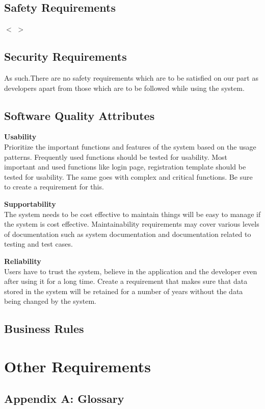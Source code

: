 \documentclass{scrreprt}
\begin{document}
\section{Safety Requirements}
$<$   $>$

\section{Security Requirements}
As such.There are no safety requirements which are to be satisfied on our part as developers apart from those which are to be followed while using the system.


\section{Software Quality Attributes}

\item \textbf{Usability}  \\
Prioritize the important functions and features of the system based on the usage patterns. Frequently used functions should be tested for usability. Most important and used functions like login page, registration template should be tested for usability. The same goes with complex and critical functions. Be sure to create a requirement for this.   \\


\item \textbf{Supportability}    \\
The system needs to be cost effective to maintain things will be easy to manage if the system is cost effective. Maintainability requirements may cover various levels of documentation such as system documentation and documentation related to testing and test cases.   \\


\item \textbf{Reliability}  \\  
Users have to trust the system, believe in the application and the developer even after using it for a long time. Create a requirement that makes sure that data stored in the system will be retained for a number of years without the data being changed by the system.   \\



\section{Business Rules}



\chapter{Other Requirements}


\section{Appendix A: Glossary}
\end{document}
